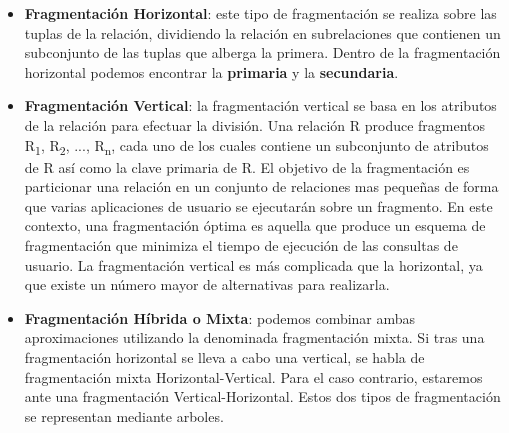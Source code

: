 \begin{itemize}
    \item \textbf{Fragmentación Horizontal}: este tipo de fragmentación se realiza sobre las tuplas de la relación, dividiendo la relación en subrelaciones que contienen un subconjunto de las tuplas que alberga la primera. Dentro de la fragmentación horizontal podemos encontrar la \textbf{primaria} y la \textbf{secundaria}.

    \item \textbf{Fragmentación Vertical}: la fragmentación vertical se basa en los atributos de la relación para efectuar la división. Una relación R produce fragmentos  R\textsubscript{1}, R\textsubscript{2}, ..., R\textsubscript{n}, cada uno de los cuales contiene un subconjunto de atributos de R así como la clave primaria de R. El objetivo de la fragmentación es particionar una relación en un conjunto de relaciones mas pequeñas de forma que varias aplicaciones de usuario se ejecutarán sobre un fragmento. En este contexto, una fragmentación óptima es aquella que produce un esquema de fragmentación que minimiza el tiempo de ejecución de las consultas de usuario. La fragmentación vertical es más complicada que la horizontal, ya que existe un número mayor de alternativas para realizarla.

    \item \textbf{Fragmentación Híbrida o Mixta}: podemos combinar ambas aproximaciones utilizando la denominada fragmentación mixta. Si tras una fragmentación horizontal se lleva a cabo una vertical, se habla de fragmentación mixta Horizontal-Vertical. Para el caso contrario, estaremos ante una fragmentación Vertical-Horizontal. Estos dos tipos de fragmentación se representan mediante arboles.
\end{itemize}

\glsaddall
\printglossaries


\newpage
{}



